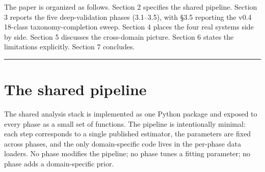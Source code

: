 \documentclass[
  11pt]{article}
\begin{document}
The paper is organized as follows. Section 2 specifies the shared
pipeline. Section 3 reports the five deep-validation phases (3.1--3.5),
with §3.5 reporting the v0.4 18-class taxonomy-completion sweep. Section
4 places the four real systems side by side. Section 5 discusses the
cross-domain picture. Section 6 states the limitations explicitly.
Section 7 concludes.

\begin{center}\rule{0.5\linewidth}{0.5pt}\end{center}

\section{The shared pipeline}\label{sec:2}

The shared analysis stack is implemented as one Python package and
exposed to every phase as a small set of functions. The pipeline is
intentionally minimal: each step corresponds to a single published
estimator, the parameters are fixed across phases, and the only
domain-specific code lives in the per-phase data loaders. No phase
modifies the pipeline; no phase tunes a fitting parameter; no phase adds
a domain-specific prior.
\end{document}
